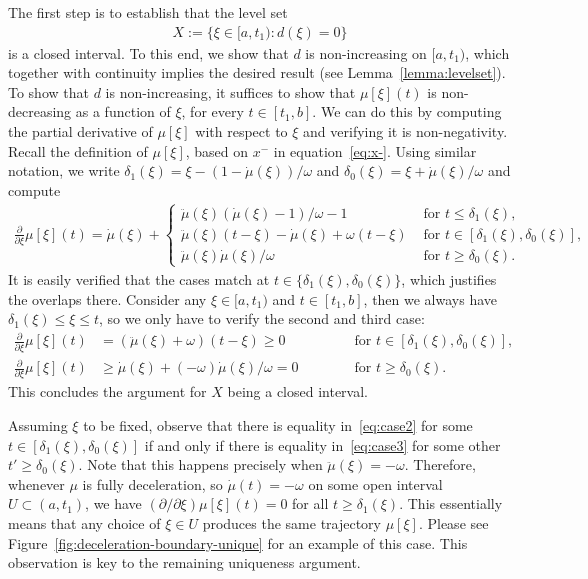 \documentclass{report}
\theoremstyle{definition}
\theoremstyle{plain}
\newcommand\halfopen[2]{\ensuremath{[#1,#2)}}
\begin{document}
The first step is to establish that the level set
\begin{align}
  X := \{ \xi \in \halfopen{a}{t_{1}} : d(\xi) = 0 \}
\end{align}
is a closed interval. To this end, we show that $d$ is non-increasing on
$\halfopen{a}{t_{1}}$, which together with continuity implies the desired result
(see Lemma~\ref{lemma:levelset}).
%
To show that $d$ is non-increasing, it suffices to show that $\mu[\xi](t)$ is
non-decreasing as a function of $\xi$, for every $t \in [t_{1}, b]$.
%
We can do this by computing the partial derivative of $\mu[\xi]$ with respect to $\xi$
and verifying it is non-negativity.
%
Recall the definition of $\mu[\xi]$, based on $x^{-}$ in equation~\eqref{eq:x-}.
%
Using similar notation, we write
$\delta_{1}(\xi) = \xi - (1 - \dot{\mu}(\xi))/\omega$ and
$\delta_{0}(\xi) = \xi + \dot{\mu}(\xi)/\omega$ and compute
%
\begin{align}
  \frac{\partial}{\partial \xi} \mu[\xi](t) =
  \dot{\mu}(\xi) +
  \begin{cases}
    \ddot{\mu}(\xi)(\dot{\mu}(\xi)-1)/\omega - 1 &\text{ for } t \leq \delta_{1}(\xi) , \\
    \ddot{\mu}(\xi)(t-\xi) - \dot{\mu}(\xi) + \omega(t-\xi) &\text{ for } t \in [\delta_{1}(\xi),\delta_{0}(\xi)] , \\
    \ddot{\mu}(\xi)\dot{\mu}(\xi)/ \omega &\text{ for } t \geq \delta_{0}(\xi) .
  \end{cases}
\end{align}
%
It is easily verified that the cases match at
$t \in \{\delta_{1}(\xi), \delta_{0}(\xi)\}$, which justifies the overlaps there.
%
Consider any $\xi \in \halfopen{a}{t_{1}}$ and $t \in [t_{1}, b]$, then we always have
$\delta_{1}(\xi) \leq \xi \leq t$, so we only have to verify the second and third case:
%
\begin{subequations}
\begin{alignat}{2}
  \frac{\partial}{\partial \xi} \mu[\xi](t) &= (\ddot{\mu}(\xi) + \omega)(t-\xi) \geq 0 \quad\quad\quad &&\text{ for } t \in [\delta_{1}(\xi) ,\delta_{0}(\xi)], \label{eq:case2} \\
  \frac{\partial}{\partial \xi} \mu[\xi](t) &\geq \dot{\mu}(\xi) + (-\omega)\dot{\mu}(\xi)/\omega = 0 &&\text{ for } t \geq \delta_{0}(\xi) . \label{eq:case3}
\end{alignat}
\end{subequations}
%
This concludes the argument for $X$ being a closed interval.

Assuming $\xi$ to be fixed, observe that there is equality in~\eqref{eq:case2} for some
$t \in [\delta_{1}(\xi), \delta_{0}(\xi)]$ if and only if there is equality in~\eqref{eq:case3}
for some other $t' \geq \delta_{0}(\xi)$. Note that this happens precisely when
$\ddot{\mu}(\xi) = -\omega$.
%
Therefore, whenever $\mu$ is fully deceleration, so $\dot{\mu}(t)=-\omega$ on
some open interval $U \subset (a, t_{1})$, we have
$(\partial/\partial \xi) \mu[\xi](t) = 0$ for all $t \geq \delta_{1}(\xi)$.
%
This essentially means that any choice of $\xi \in U$ produces the same
trajectory $\mu[\xi]$. Please see Figure~\ref{fig:deceleration-boundary-unique}
for an example of this case.
%
This observation is key to the remaining uniqueness argument.
\end{document}
